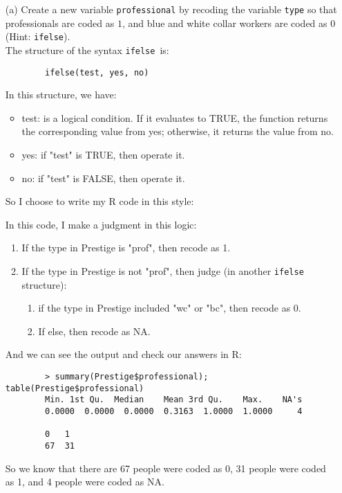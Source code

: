 \documentclass[12pt,letterpaper]{article}
\begin{document}
\newpage
\begin{enumerate}
	
	\item [(a)]
	Create a new variable \texttt{professional} by recoding the variable \texttt{type} so that professionals are coded as $1$, and blue and white collar workers are coded as $0$ (Hint: \texttt{ifelse}).\\
	
	The structure of the syntax \texttt{ifelse}\ is: 
	\begin{verbatim}
		ifelse(test, yes, no)
	\end{verbatim} 
	
	In this structure, we have:
	\begin{itemize}
		\item test: is a logical condition. If it evaluates to TRUE, the function returns the corresponding value from yes; otherwise, it returns the value from no.
		\item yes: if "test" is TRUE, then operate it.
		\item no: if "test" is FALSE, then operate it.
	\end{itemize}
		
	
	So I choose to write my R code in this style:
	
	
	In this code, I make a judgment in this logic:
	\begin{enumerate}
		\item If the type in Prestige is "prof", then recode as 1.
		\item If the type in Prestige is not "prof", then judge (in another \texttt{ifelse} structure):
			\begin{enumerate}
				\item if the type in Prestige included "wc" or "bc", then recode as 0.
				\item If else, then recode as NA.
			\end{enumerate}
	\end{enumerate}
	And we can see the output and check our answers in R:
	\begin{verbatim}
		> summary(Prestige$professional); table(Prestige$professional)   
		Min. 1st Qu.  Median    Mean 3rd Qu.    Max.    NA's  
		0.0000  0.0000  0.0000  0.3163  1.0000  1.0000     4 
		
		0   1 
		67  31 
	\end{verbatim} 
	So we know that there are 67 people were coded as 0, 31 people were coded as 1, and 4 people were coded as NA.
	\newpage
	

\end{enumerate}
\end{document}
